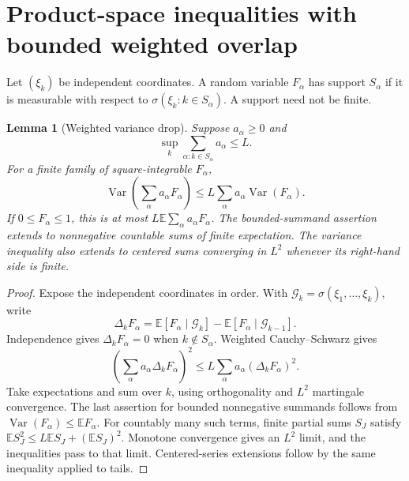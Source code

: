 \documentclass[11pt]{article}
\numberwithin{equation}{section}
\newtheorem{lemma}[theorem]{Lemma}
\theoremstyle{definition}
\theoremstyle{remark}
\newcommand{\E}{\mathbb E}
\newcommand{\Var}{\operatorname{Var}}
\begin{document}
\section{Product-space inequalities with bounded weighted overlap}\label{sec:overlap}

Let $(\xi_k)$ be independent coordinates. A random variable $F_\alpha$ has
support $S_\alpha$ if it is measurable with respect to
$\sigma(\xi_k:k\in S_\alpha)$. A support need not be finite.

\begin{lemma}[Weighted variance drop]\label{lem:variance-drop}
Suppose $a_\alpha\ge0$ and
\begin{equation}\label{eq:overlapcondition}
 \sup_k\sum_{\alpha:k\in S_\alpha}a_\alpha\le L.
\end{equation}
For a finite family of square-integrable $F_\alpha$,
\begin{equation}\label{eq:weightedvariance}
 \Var\left(\sum_\alpha a_\alpha F_\alpha\right)
 \le L\sum_\alpha a_\alpha\Var(F_\alpha).
\end{equation}
If $0\le F_\alpha\le1$, this is at most
$L\E\sum_\alpha a_\alpha F_\alpha$.
The bounded-summand assertion extends to nonnegative countable sums of finite
expectation. The variance inequality also extends to centered sums converging
in $L^2$ whenever its right-hand side is finite.
\end{lemma}
\begin{proof}
Expose the independent coordinates in order. With
$\mathcal G_k=\sigma(\xi_1,\ldots,\xi_k)$, write
\[
 \Delta_kF_\alpha=\E[F_\alpha\mid\mathcal G_k]
                  -\E[F_\alpha\mid\mathcal G_{k-1}].
\]
Independence gives $\Delta_kF_\alpha=0$ when $k\notin S_\alpha$.
Weighted Cauchy--Schwarz gives
\[
 \left(\sum_\alpha a_\alpha\Delta_kF_\alpha\right)^2
 \le L\sum_\alpha a_\alpha(\Delta_kF_\alpha)^2.
\]
Take expectations and sum over $k$, using orthogonality and $L^2$ martingale
convergence. The last assertion for bounded nonnegative summands follows from
$\Var(F_\alpha)\le\E F_\alpha$. For countably many such terms, finite partial
sums $S_J$ satisfy
$\E S_J^2\le L\E S_J+(\E S_J)^2$. Monotone convergence gives an $L^2$ limit,
and the inequalities pass to that limit. Centered-series extensions follow by
the same inequality applied to tails.
\end{proof}
\end{document}
